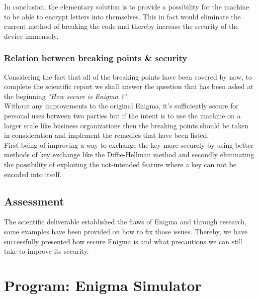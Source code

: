 \documentclass[conference,compsoc]{IEEEtran}
\begin{document}
In conclusion, the elementary solution is to provide a possibility for the machine to be able to encrypt letters into themselves. This in fact would eliminate the current method of breaking the code and thereby increase the security of the device immensely.\\

\subsubsection{Relation between breaking points \& security} Considering the fact that all of the breaking points have been covered by now, to complete the scientific report we shall answer the question that has been asked at the beginning \emph{"How secure is Enigma ?"}\\

Without any improvements to the original Enigma, it's sufficiently secure for personal uses between two parties but if the intent is to use the machine on a larger scale like business organizations then the breaking points should be taken in consideration and implement the remedies that have been listed.\\
First being of improving a way to exchange the key more securely by using better methods of key exchange like the Diffie-Hellman method and secondly eliminating the possibility of exploiting the not-intended feature where a key can not be encoded into itself.\\




\subsection{Assessment}
The scientific deliverable established the flaws of Enigma and through research, some examples have been provided on how to fix those issues. 
Thereby, we have successfully presented how secure Enigma is and what precautions we can still take to improve its security.\\

\section{Program: Enigma Simulator}
\label{sec-production}
\end{document}
